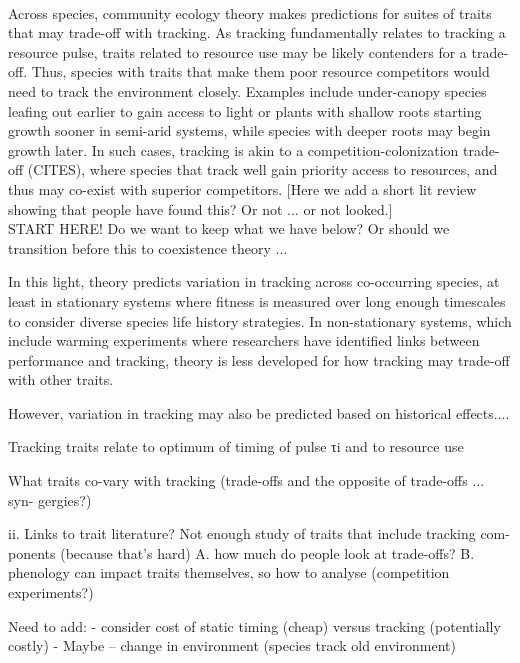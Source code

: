 \documentclass[11pt,letterpaper]{article}
\begin{document}
\\
Across species, community ecology theory makes predictions for suites of traits that may trade-off with tracking. As tracking fundamentally relates to tracking a resource pulse, traits related to resource use may be likely contenders for a trade-off. Thus, species with traits that make them poor resource competitors would need to track the environment closely. Examples include under-canopy species leafing out earlier to gain access to light or plants with shallow roots starting growth sooner in semi-arid systems, while species with deeper roots may begin growth later. In such cases, tracking is akin to a competition-colonization trade-off (CITES), where species that track well gain priority access to resources, and thus may co-exist with superior competitors. [Here we add a short lit review showing that people have found this? Or not ... or not looked.]
\\
START HERE! Do we want to keep what we have below? Or should we transition before this to coexistence theory ... 

In this light, theory predicts variation in tracking across co-occurring species, at least in stationary systems where fitness is measured over long enough timescales to consider diverse species life history strategies. In non-stationary systems, which include warming experiments where researchers have identified links between performance and tracking, theory is less developed for how tracking may trade-off with other traits. 


However, variation in tracking may also be predicted based on historical effects.... 

Tracking traits relate to optimum of timing of pulse τi and to resource use 

What traits co-vary with tracking (trade-offs and the opposite of trade-offs ... syn- gergies?)

ii. Links to trait literature? Not enough study of traits that include tracking com- ponents (because that’s hard)
      A. how much do people look at trade-offs?
       B. phenology can impact traits themselves, so how to analyse (competition experiments?)

Need to add: 
- consider cost of static timing (cheap) versus tracking (potentially costly)
- Maybe -- change in environment (species track old environment)
\end{document}
